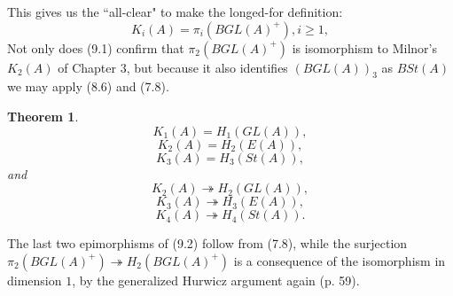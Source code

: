 \documentclass[openany,leqno]{book}  %
\newtheorem{theorem}{Theorem}[chapter]
\begin{document}
This gives us the ``all-clear" to make the longed-for definition:
\[K_i(A)=\pi_i(BGL(A)^+), i\geqslant 1,\]
Not only does (9.1) confirm that $\pi_2(BGL(A)^+)$ is isomorphism to Milnor's $K_2(A)$ of Chapter 3, but because it also identifies $(BGL(A))_3$ as $BSt(A)$ we may apply (8.6) and (7.8).
\begin{theorem}
  \[K_1(A)=H_1(GL(A)),\]
  \[K_2(A)=H_2(E(A)),\]
  \[K_3(A)=H_3(St(A)),\]
  and
  \[K_2(A)\twoheadrightarrow H_2(GL(A)),\]
  \[K_3(A)\twoheadrightarrow H_3(E(A)),\]
  \[K_4(A)\twoheadrightarrow H_4(St(A)).\]
\end{theorem}
The last two epimorphisms of (9.2) follow from (7.8), while the surjection $\pi_2(BGL(A)^+)\twoheadrightarrow H_2(BGL(A)^+)$ is a consequence of the isomorphism in dimension $1$, by the generalized Hurwicz argument again (p. 59).
\end{document}
